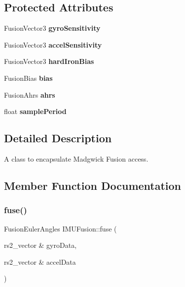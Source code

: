 \subsection*{Protected Attributes}
\begin{DoxyCompactItemize}
\item 
\mbox{\label{classIMUFusion_ab0606b1bd85ac4b5c60296f4d11f8aad}} 
Fusion\+Vector3 {\bfseries gyro\+Sensitivity}
\item 
\mbox{\label{classIMUFusion_aeb57532923c759a15220d4e1480a9793}} 
Fusion\+Vector3 {\bfseries accel\+Sensitivity}
\item 
\mbox{\label{classIMUFusion_a190967d6da7b3375520be36f5cd0c88f}} 
Fusion\+Vector3 {\bfseries hard\+Iron\+Bias}
\item 
\mbox{\label{classIMUFusion_add7a4e02f169aa10e13f4dfb718d0875}} 
Fusion\+Bias {\bfseries bias}
\item 
\mbox{\label{classIMUFusion_a1290813d01c634775a0ffb4f3fef80eb}} 
Fusion\+Ahrs {\bfseries ahrs}
\item 
\mbox{\label{classIMUFusion_a9d546ef52bd0f573486527f6f9e57138}} 
float {\bfseries sample\+Period}
\end{DoxyCompactItemize}


\subsection{Detailed Description}
A class to encapsulate Madgwick Fusion access. 



\subsection{Member Function Documentation}
\mbox{\label{classIMUFusion_a47060c975f3a11d03dca5de9de1e8098}} 
\subsubsection{\texorpdfstring{fuse()}{fuse()}}
{\footnotesize\ttfamily Fusion\+Euler\+Angles I\+M\+U\+Fusion\+::fuse (\begin{DoxyParamCaption}\item[{rs2\+\_\+vector \&}]{gyro\+Data,  }\item[{rs2\+\_\+vector \&}]{accel\+Data }\end{DoxyParamCaption})}


